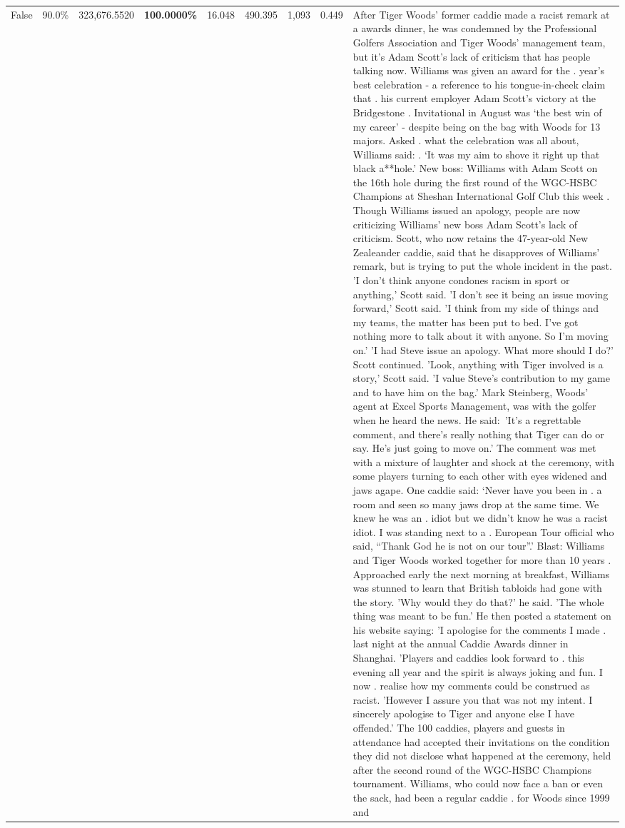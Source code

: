 \begin{table}[H]
\begin{tabular}{lllrlllll}
False & 90.0\% & 323,676.5520 & \bfseries \color{red} 100.0000\% & 16.048 & 490.395 & 1,093 & 0.449 & After Tiger Woods' former caddie made a racist remark at a awards dinner, he was condemned by the Professional Golfers Association and Tiger Woods' management team, but it's Adam Scott's lack of criticism that has people talking now. Williams was given an award for the . year’s best celebration - a reference to his tongue-in-cheek claim that . his current employer Adam Scott’s victory at the Bridgestone . Invitational in August was ‘the best win of my career’ - despite being on the bag with Woods for 13 majors. Asked . what the celebration was all about, Williams said: . ‘It was my aim to shove it right up that black a**hole.’ New boss: Williams with Adam Scott  on the 16th hole during the first round of the WGC-HSBC Champions at Sheshan International Golf Club this week . Though Williams issued an apology, people are now criticizing Williams' new boss Adam Scott's lack of criticism. Scott, who now retains the 47-year-old New Zealeander caddie, said that he disapproves of Williams' remark, but is trying to put the whole incident in the past. 'I don't think anyone condones racism in sport or anything,' Scott said. 'I don't see it being an issue moving forward,' Scott said. 'I think from my side of things and my teams, the matter has been put to bed. I've got nothing more to talk about it with anyone. So I'm moving on.' 'I had Steve issue an apology. What more should I do?' Scott continued. 'Look, anything with Tiger involved is a story,' Scott said. 'I value Steve's contribution to my game and to have him on the bag.' Mark Steinberg, Woods' agent at Excel Sports Management, was with the golfer when he heard the news. He said: 'It's a regrettable comment, and there's really nothing that Tiger can do or say. He's just going to move on.' The comment was met with a mixture of laughter and shock at the ceremony, with some players turning to each other with eyes widened and jaws agape. One caddie said: ‘Never have you been in . a room and seen so many jaws drop at the same time. We knew he was an . idiot but we didn’t know he was a racist idiot. I was standing next to a . European Tour official who said, “Thank God he is not on our tour”.’ Blast: Williams and Tiger Woods worked together for more than 10 years . Approached early the next morning at breakfast, Williams was stunned to learn that British tabloids had gone with the story. 'Why would they do that?' he said. 'The whole thing was meant to be fun.' He then posted a statement on his website saying: 'I apologise for the comments I made . last night at the annual Caddie Awards dinner in Shanghai. 'Players and caddies look forward to . this evening all year and the spirit is always joking and fun. I now . realise how my comments could be construed as racist. 'However I assure you that was not my intent. I sincerely apologise to Tiger and anyone else I have offended.' The 100 caddies, players and guests in attendance had accepted their invitations on the condition they did not disclose what happened at the ceremony, held after the second round of the WGC-HSBC Champions tournament. Williams, who could now face a ban or even the sack, had been a regular caddie . for Woods since 1999 and 
\end{tabular}
\end{table}
